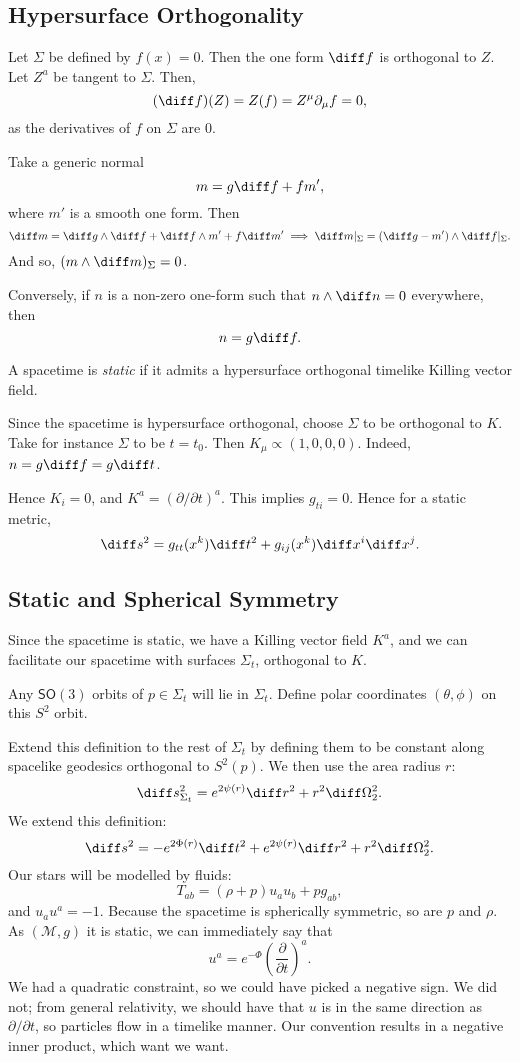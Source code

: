 \documentclass[12pt]{article}
\begin{document}
\subsection{Hypersurface Orthogonality}%
\label{sub:ho}

Let $\Sigma$ be defined by $f(x) = 0$. Then the one form $\diff f$ is orthogonal to $Z$. Let $Z^{a}$ be tangent to $\Sigma$. Then,
\[
	(\diff f)(Z) = Z(f) = Z^\mu \partial_\mu f = 0,
\]
as the derivatives of $f$ on $\Sigma$ are 0.

Take a generic normal
\[
m = g \diff f + f m',
\]
where $m'$ is a smooth one form. Then
\[
\diff m = \diff g \wedge \diff f + \diff f \wedge m' + f \diff m' \implies \diff m|_{\Sigma} = (\diff g - m') \wedge \diff f|_{\Sigma}.
\]
And so, $(m \wedge \diff m)_\Sigma = 0$.

Conversely, if $n$ is a non-zero one-form such that $n \wedge \diff n = 0$ everywhere, then
\[
n = g \diff f.
\]
\begin{definition}
	A spacetime is \emph{static} if it admits a hypersurface orthogonal timelike Killing vector field.
\end{definition}

Since the spacetime is hypersurface orthogonal, choose $\Sigma$ to be orthogonal to $K$. Take for instance $\Sigma$ to be $t = t_0$. Then $K_\mu \propto (1, 0, 0, 0)$. Indeed, $n = g\diff f = g \diff t$.

Hence $K_i = 0$, and $K^a = (\partial/\partial t)^a$. This implies $g_{ti} = 0$. Hence for a static metric,
\[
\diff s^2 = g_{tt}(x^k) \diff t^2 + g_{ij}(x^k) \diff x^i \diff x^j.
\]
\subsection{Static and Spherical Symmetry}%
\label{sub:sss}

Since the spacetime is static, we have a Killing vector field $K^a$, and we can facilitate our spacetime with surfaces $\Sigma_t$, orthogonal to $K$.

Any $\mathsf{SO}(3)$ orbits of $p \in \Sigma_t$ will lie in $\Sigma_t$. Define polar coordinates $(\theta, \phi)$ on this $S^2$ orbit.

Extend this definition to the rest of $\Sigma_t$ by defining them to be constant along spacelike geodesics orthogonal to $S^2(p)$. We then use the area radius $r$:
\[
\diff s^2_{\Sigma_t} = e^{2 \psi(r)} \diff r^2 + r^2 \diff \Omega^2_2.
\]
We extend this definition:
\[
\diff s^2 = - e^{2 \Phi(r)} \diff t^2 + e^{2 \psi(r)} \diff r^2 + r^2 \diff \Omega^2_2.
\]
Our stars will be modelled by fluids:
\[
T_{ab}= (\rho + p)u_a u_b + p g_{ab},
\]
and $u_a u^a = -1$. Because the spacetime is spherically symmetric, so are $p$ and $\rho$. As $(\mathcal{M}, g)$ it is static, we can immediately say that
\[
u^a = e^{-\Phi} \left( \frac{\partial}{\partial t} \right)^{a}.
\]
We had a quadratic constraint, so we could have picked a negative sign. We did not; from general relativity, we should have that $u$ is in the same direction as $\partial/\partial t$, so particles flow in a timelike manner. Our convention results in a negative inner product, which want we want.
\end{document}
